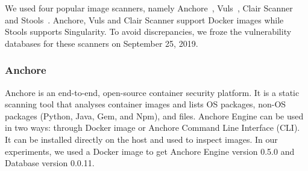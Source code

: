 \documentclass[a4paper,num-refs]{oup-contemporary}
\begin{document}


We used four popular image scanners, namely Anchore~\cite{github_2019},
Vuls~\cite{future-architect_2019}, Clair Scanner~\cite{arminc_2019} and
Stools~\cite{stools}. Anchore, Vuls and Clair Scanner support Docker
images while Stools supports Singularity. 
To avoid discrepancies, we froze the vulnerability
databases for these scanners on September 25, 2019.


\subsubsection{Anchore}

Anchore is an end-to-end, open-source container security platform. It
is a static
scanning tool that analyses container images and lists OS
packages, non-OS packages (Python, Java, Gem, and Npm), and files.
Anchore Engine can be used in two ways: through Docker image or Anchore
Command Line Interface (CLI).
It can be
installed directly on the host and used to inspect images.
In our experiments, we used a Docker image to get Anchore Engine version 0.5.0 and Database
version 0.0.11.
\end{document}
